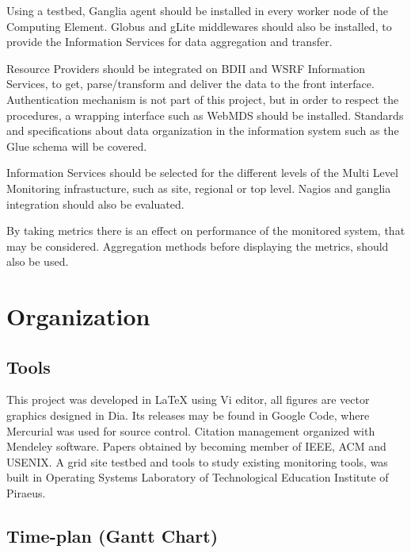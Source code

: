 Using a testbed, Ganglia agent should be installed in every worker node of the Computing Element. Globus and gLite middlewares should also be installed, to provide the Information Services for data aggregation and transfer.

Resource Providers should be integrated on BDII and WSRF Information Services, to get, parse/transform and deliver the data to the front interface. Authentication mechanism is not part of this project, but in order to respect the procedures, a wrapping interface such as WebMDS should be installed. Standards and specifications about data organization in the information system such as the Glue schema will be covered.

Information Services should be selected for the different levels of the Multi Level Monitoring infrastucture, such as site, regional or top level. Nagios and ganglia integration should also be evaluated.

By taking metrics there is an effect on performance of the monitored system, that may be considered. Aggregation methods before displaying the metrics, should also be used.

\section{Organization}

\subsection[Tools]{Tools}
This project was developed in \LaTeX{} using Vi editor, all figures are vector graphics designed in Dia. Its releases may be found in Google Code, where Mercurial was used for source control. Citation management organized with Mendeley software. Papers obtained by becoming member of IEEE, ACM and USENIX. A grid site testbed and tools to study existing monitoring tools, was built in Operating Systems Laboratory of Technological Education Institute of Piraeus.

\subsection[Time plan]{Time-plan (Gantt Chart)}

